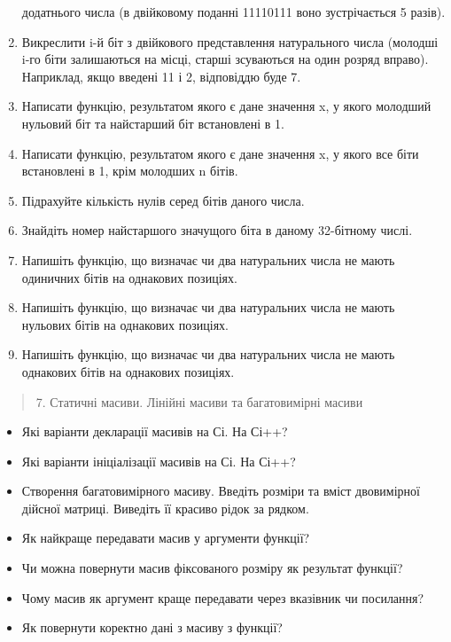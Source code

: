 \documentclass[]{article}
\begin{document}
\begin{enumerate}
  додатнього числа (в двійковому поданні 11110111 воно зустрічається 5
  разів).
\item
  Викреслити i-й біт з двійкового представлення натурального числа
  (молодші i-го біти залишаються на місці, старші зсуваються на один
  розряд вправо). Наприклад, якщо введені 11 і 2, відповіддю буде 7.
\item
  \protect\hypertarget{_Hlk65236142}{}{} Написати функцію, результатом
  якого є дане значення x, у якого молодший нульовий біт та найстарший
  біт встановлені в 1.
\item
  Написати функцію, результатом якого є дане значення x, у якого все
  біти встановлені в 1, крім молодших n бітів.
\item
  Підрахуйте кількість нулів серед бітів даного числа.
\item
  Знайдіть номер найстаршого значущого біта в даному 32-бітному числі.
\item
  Напишіть функцію, що визначає чи два натуральних числа не мають
  одиничних бітів на однакових позиціях.
\item
  Напишіть функцію, що визначає чи два натуральних числа не мають
  нульових бітів на однакових позиціях.
\item
  Напишіть функцію, що визначає чи два натуральних числа не мають
  однакових бітів на однакових позиціях.
\end{enumerate}

\begin{quote}
7. Статичні масиви. Лінійні масиви та багатовимірні масиви
\end{quote}

\begin{itemize}
\item
  Які варіанти декларації масивів на Сі. На Сі++?
\item
  Які варіанти ініціалізації масивів на Сі. На Сі++?
\item
  Створення багатовимірного масиву. Введіть розміри та вміст двовимірної
  дійсної матриці. Виведіть її красиво рідок за рядком.
\item
  Як найкраще передавати масив у аргументи функції?
\item
  Чи можна повернути масив фіксованого розміру як результат функції?
\item
  Чому масив як аргумент краще передавати через вказівник чи посилання?
\item
  Як повернути коректно дані з масиву з функції?
\end{itemize}
\end{document}
